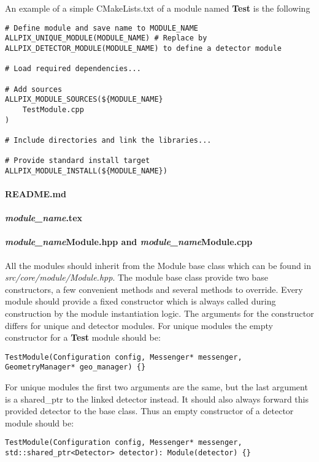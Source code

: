 An example of a simple CMakeLists.txt of a module named \textbf{Test} is the following
\vspace{5pt}

\begin{verbatim}
# Define module and save name to MODULE_NAME
ALLPIX_UNIQUE_MODULE(MODULE_NAME) # Replace by ALLPIX_DETECTOR_MODULE(MODULE_NAME) to define a detector module

# Load required dependencies...

# Add sources
ALLPIX_MODULE_SOURCES(${MODULE_NAME} 
    TestModule.cpp
)

# Include directories and link the libraries...

# Provide standard install target
ALLPIX_MODULE_INSTALL(${MODULE_NAME})
\end{verbatim}

\paragraph{README.md}
\todo

\paragraph{\textit{module\_name}.tex}
\todo

\paragraph{\textit{module\_name}Module.hpp and \textit{module\_name}Module.cpp}
All the modules should inherit from the Module base class which can be found in \textit{src/core/module/Module.hpp}. The module base class provide two base constructors, a few convenient methods and several methods to override. Every module should provide a fixed constructor which is always called during construction by the module instantiation logic. The arguments for the constructor differs for unique and detector modules. For unique modules the empty constructor for a \textbf{Test} module should be:
\begin{verbatim}
TestModule(Configuration config, Messenger* messenger, GeometryManager* geo_manager) {}
\end{verbatim}

For unique modules the first two arguments are the same, but the last argument is a shared\_ptr to the linked detector instead. It should also always forward this provided detector to the base class. Thus an empty constructor of a detector module should be:
\begin{verbatim}
TestModule(Configuration config, Messenger* messenger, std::shared_ptr<Detector> detector): Module(detector) {}
\end{verbatim}

